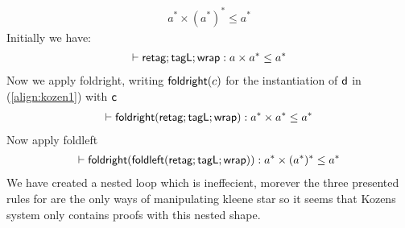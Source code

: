 \documentclass[a4paper,UKenglish,cleveref, autoref, thm-restate]{lipics-v2021}
\begin{document}
\begin{align}
a ^* \times (a^*)^* \leq a^*
\end{align}
Initially we have: 
\begin{align}
\contains{}{\dslcom{retag};\dslcom{tagL};\dslcom{wrap}}{a \times a^*}{a^*}
\end{align}
Now we apply \textsf{foldright}, writing $\textsf{foldright}(c)$ for the instantiation of $\textsf{d}$ in (\ref{align:kozen1}) with $\textsf{c}$
\begin{align}
\contains{}{\dslcom{foldright}(\dslcom{retag};\dslcom{tagL};\dslcom{wrap})}{a^* \times a^*}{a^*}
\end{align}
Now apply \textsf{foldleft}
\begin{align}
\contains{}{\dslcom{foldright}(\dslcom{foldleft}(\dslcom{retag};\dslcom{tagL};\dslcom{wrap}))}{a^* \times (a^*)^*}{a^*}
\end{align}
We have created a nested loop which is ineffecient, morever the three presented rules for are the only ways of manipulating kleene star so it seems that Kozens system only contains proofs with this nested shape.
\end{document}
